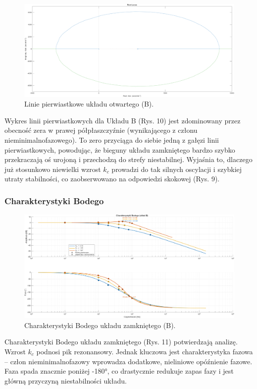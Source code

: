 \documentclass[12pt,a4paper]{article}
\begin{document}
	\begin{figure}[H]
		\centering
		\includegraphics[width=0.8\linewidth]{zdjecia/LP_ukladB.png}
		\caption{Linie pierwiastkowe układu otwartego (B).}
		\label{fig:LP_ukladB}
	\end{figure}
	
	Wykres linii pierwiastkowych dla Układu B (Rys. 10) jest zdominowany przez obecność zera w prawej półpłaszczyźnie (wynikającego z członu nieminimalnofazowego). To zero przyciąga do siebie jedną z gałęzi linii pierwiastkowych, powodując, że bieguny układu zamkniętego bardzo szybko przekraczają oś urojoną i przechodzą do strefy niestabilnej. Wyjaśnia to, dlaczego już stosunkowo niewielki wzrost $k_c$ prowadzi do tak silnych oscylacji i szybkiej utraty stabilności, co zaobserwowano na odpowiedzi skokowej (Rys. 9).
	
	\subsubsection{Charakterystyki Bodego}
	
	\begin{figure}[H]
		\centering
		\includegraphics[width=1\linewidth]{zdjecia/Bode_ukladB.png}
		\caption{Charakterystyki Bodego układu zamkniętego (B).}
		\label{fig:Bode_ukladB}
	\end{figure}
	
	Charakterystyki Bodego układu zamkniętego (Rys. 11) potwierdzają analizę. Wzrost $k_c$ podnosi pik rezonansowy. Jednak kluczowa jest charakterystyka fazowa – człon nieminimalnofazowy wprowadza dodatkowe, nieliniowe opóźnienie fazowe. Faza spada znacznie poniżej -180°, co drastycznie redukuje zapas fazy i jest główną przyczyną niestabilności układu.
	
\end{document}
